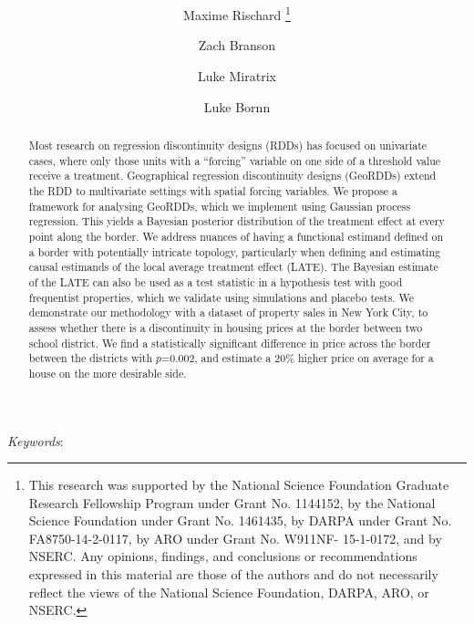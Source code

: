\documentclass[12pt]{article}
\begin{document}
\singlespacing


\title{
    \georddtitle
}
\author[a]{Maxime Rischard
	\thanks{
		This research was supported by the National Science Foundation Graduate Research Fellowship Program under Grant No. 1144152, by the National Science Foundation under Grant No. 1461435, by DARPA under Grant No. FA8750-14-2-0117, by ARO under Grant No. W911NF- 15-1-0172, and by NSERC. Any opinions, findings, and conclusions or recommendations expressed in this material are those of the authors and do not necessarily reflect the views of the National Science Foundation, DARPA, ARO, or NSERC.
	}
}
\author[a]{Zach Branson}
\author[b]{Luke Miratrix}
\author[c]{Luke Bornn}
\maketitle

\begin{abstract}
    Most research on regression discontinuity designs (RDDs) has focused on univariate cases, where only those units with a ``forcing'' variable on one side of a threshold value receive a treatment.
    Geographical regression discontinuity designs (GeoRDDs) extend the RDD to multivariate settings with spatial forcing variables.
    We propose a framework for analysing GeoRDDs, which we implement using Gaussian process regression. 
    This yields a Bayesian posterior distribution of the treatment effect at every point along the border.
    We address nuances of having a functional estimand defined on a border with potentially intricate topology, particularly when defining and estimating causal estimands of the local average treatment effect (LATE).
    The Bayesian estimate of the LATE can also be used as a test statistic
    in a hypothesis test with good frequentist properties, 
    which we validate using simulations and placebo tests.
    We demonstrate our methodology with a dataset of property sales in New York City,
    to assess whether there is a discontinuity in housing prices at the border between two school district.
    We find a statistically significant difference in price across the border between the districts with \(p\)=0.002, and estimate a 20\%  higher price on average for a house on the more desirable side.
\end{abstract}

\noindent%
{\it Keywords}: \georddkeywords
\vfill
\newpage
\end{document}
